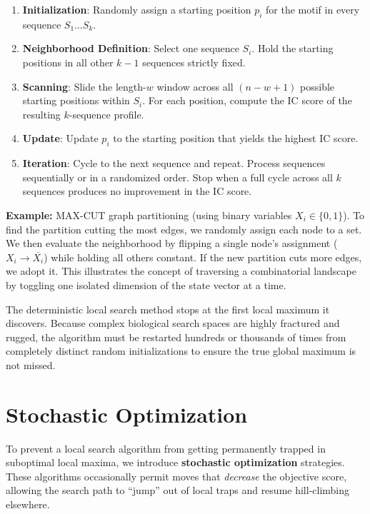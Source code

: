 \begin{enumerate}
  \item \textbf{Initialization}: Randomly assign a starting position $p_i$ for the motif in every sequence $S_1 \dots S_k$.
  \item \textbf{Neighborhood Definition}: Select one sequence $S_i$. Hold the starting positions in all other $k-1$ sequences strictly fixed.
  \item \textbf{Scanning}: Slide the length-$w$ window across all $(n-w+1)$ possible starting positions within $S_i$. For each position, compute the IC score of the resulting $k$-sequence profile.
  \item \textbf{Update}: Update $p_i$ to the starting position that yields the highest IC score.
  \item \textbf{Iteration}: Cycle to the next sequence and repeat. Process sequences sequentially or in a randomized order. Stop when a full cycle across all $k$ sequences produces no improvement in the IC score.
\end{enumerate}

\textbf{Example:}
MAX-CUT graph partitioning (using binary variables $X_i \in \{0,1\}$).
To find the partition cutting the most edges, we randomly assign each node to a set. We then evaluate the neighborhood by flipping a single node's assignment ($X_i \to \overline{X_i}$) while holding all others constant. If the new partition cuts more edges, we adopt it.
This illustrates the concept of traversing a combinatorial landscape by toggling one isolated dimension of the state vector at a time.

\sta The deterministic local search method stops at the first local maximum it discovers. Because complex biological search spaces are highly fractured and rugged, the algorithm must be restarted hundreds or thousands of times from completely distinct random initializations to ensure the true global maximum is not missed.

\section{Stochastic Optimization}

To prevent a local search algorithm from getting permanently trapped in suboptimal local maxima, we introduce \textbf{stochastic optimization} strategies. These algorithms occasionally permit moves that \textit{decrease} the objective score, allowing the search path to ``jump'' out of local traps and resume hill-climbing elsewhere.

